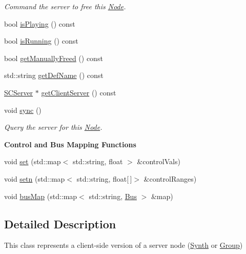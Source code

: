 \begin{DoxyCompactItemize}
\begin{DoxyCompactList}\small\item\em Command the server to free this \hyperlink{classsc_1_1Node}{Node}. \end{DoxyCompactList}\item 
bool \hyperlink{classsc_1_1Node_a551ece6304c94df930d59bc6fe13b6ba}{is\-Playing} () const 
\item 
bool \hyperlink{classsc_1_1Node_a3aa0c120ba5a7983e7b0e2f8ba6ace73}{is\-Running} () const 
\item 
bool \hyperlink{classsc_1_1Node_afc9868d6f3186648f4ab178929531003}{get\-Manually\-Freed} () const 
\item 
std\-::string \hyperlink{classsc_1_1Node_a7b6432f40057dc5f8f4d860defe3889a}{get\-Def\-Name} () const 
\item 
\hyperlink{classsc_1_1SCServer}{S\-C\-Server} $\ast$ \hyperlink{classsc_1_1Node_ae62cc58163364d644cfa9df669594d4f}{get\-Client\-Server} () const 
\item 
\hypertarget{classsc_1_1Node_a545de1cb729a6c7458396984f743b53f}{void \hyperlink{classsc_1_1Node_a545de1cb729a6c7458396984f743b53f}{sync} ()}\label{classsc_1_1Node_a545de1cb729a6c7458396984f743b53f}

\begin{DoxyCompactList}\small\item\em Query the server for this \hyperlink{classsc_1_1Node}{Node}. \end{DoxyCompactList}\end{DoxyCompactItemize}
\begin{Indent}{\bf Control and Bus Mapping Functions}\par
\begin{DoxyCompactItemize}
\item 
void \hyperlink{classsc_1_1Node_af29f544918afd0a212450c189e525224}{set} (std\-::map$<$ std\-::string, float $>$ \&control\-Vals)
\item 
void \hyperlink{classsc_1_1Node_a66e25d5cdfe57e7b9930a121fcc1d3ce}{setn} (std\-::map$<$ std\-::string, float\mbox{[}$\,$\mbox{]}$>$ \&control\-Ranges)
\item 
void \hyperlink{classsc_1_1Node_ac1c3c7c888c46c4f731862871d2dea7b}{bus\-Map} (std\-::map$<$ std\-::string, \hyperlink{classsc_1_1Bus}{Bus} $>$ \&map)
\end{DoxyCompactItemize}
\end{Indent}


\subsection{Detailed Description}
This class represents a client-\/side version of a server node (\hyperlink{classsc_1_1Synth}{Synth} or \hyperlink{classsc_1_1Group}{Group}) 


